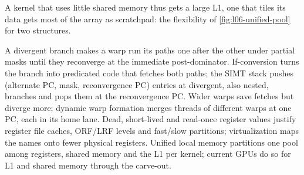 \documentclass[../main.tex]{subfiles}
\begin{document}
%
A kernel that uses little shared memory thus gets a large L1, one that
tiles its data gets most of the array as scratchpad: the flexibility of
\cref{fig:l06-unified-pool} for two structures.

\begin{keypoint}
  A divergent branch makes a warp run its paths one after the other
  under partial masks until they reconverge at the immediate
  post-dominator.  If-conversion turns the branch into predicated code
  that fetches both paths; the SIMT stack pushes (alternate PC, mask,
  reconvergence PC) entries at divergent, also nested, branches and pops
  them at the reconvergence PC.  Wider warps save
  fetches but diverge more; dynamic warp formation merges threads of
  different warps at one PC, each in its home lane.  Dead, short-lived
  and read-once register values justify register file caches, ORF/LRF
  levels and fast/slow partitions; virtualization maps the names onto
  fewer physical registers.
  Unified local memory partitions one pool among registers, shared
  memory and the L1 per kernel; current GPUs do so for L1 and shared
  memory through the carve-out.
\end{keypoint}
\end{document}

